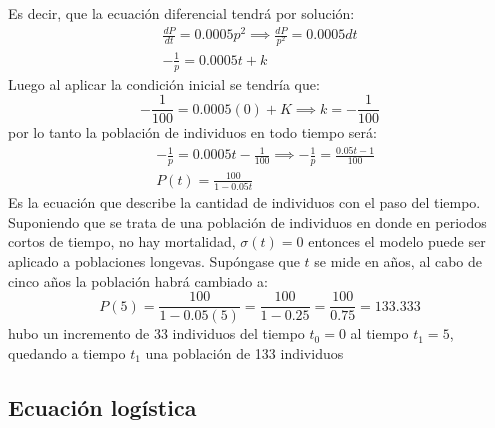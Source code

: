 Es decir, que la ecuación diferencial tendrá por solución:
\begin{align*}
    \frac{dP}{dt}=0.0005p^2\implies \frac{dP}{p^2}=0.0005dt\\
    -\frac{1}{p}=0.0005t+k
\end{align*}
Luego al aplicar la condición inicial se tendría que: 
\begin{equation*}
    -\frac{1}{100}=0.0005(0)+K\implies k=-\frac{1}{100}
\end{equation*}
por lo tanto la población de individuos en todo tiempo será: 
\begin{align*}
    &-\frac{1}{p}=0.0005t-\frac{1}{100}\implies -\frac{1}{p}=\frac{0.05t-1}{100}\\
    &P(t)=\frac{100}{1-0.05t}
\end{align*}
Es la ecuación que describe la cantidad de individuos con el paso del tiempo. Suponiendo que se trata de una población de individuos en donde en periodos cortos de tiempo, no hay mortalidad,
$\sigma(t)=0$ entonces el modelo puede ser aplicado a poblaciones longevas.
Supóngase que $t$ se mide en años, al cabo de cinco años la población habrá cambiado a:
\begin{equation*}
    P(5)=\frac{100}{1-0.05(5)}=\frac{100}{1-0.25}=\frac{100}{0.75}=133.333
\end{equation*}
hubo un incremento de 33 individuos del tiempo $t_0=0$ al tiempo $t_1=5$, quedando a tiempo $t_1$ una población de 133 individuos

%
%

\subsection{Ecuación logística}

